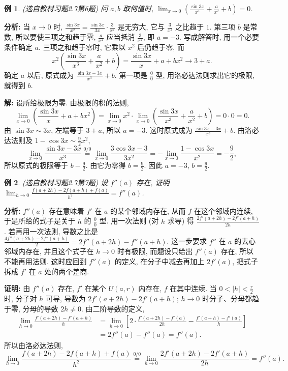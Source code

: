 \documentclass[UTF8,openany]{ctexbook}
\theoremstyle{chinesetextbook}
\newtheorem{example}{例}[section]
\newenvironment{cnproof}{\par\indent\textbf{证明:} \ignorespaces}{\par}
\newenvironment{cnsolution}{\par\indent\textbf{解:} \ignorespaces}{\par}
\begin{document}
\begin{example}\label{ex:c2-h7-6}
\textnormal{(选自教材习题2.7第6题)} 问 $a,b$ 取何值时, $\displaystyle\lim_{x\to0}\left(\frac{\sin3x}{x^3}+\frac a{x^2}+b\right)=0$.
\end{example}
\par\indent\textbf{分析:} 当 $x\to0$ 时, $\displaystyle\frac{\sin3x}{x^3}=\frac{\sin3x}{3x}\cdot\frac3{x^2}$ 是无穷大, 它与 $\displaystyle\frac3{x^2}$ 之比趋于 $1$. 第三项 $b$ 是常数, 所以要使三项之和趋于零, $\displaystyle\frac a{x^2}$ 应当抵消 $\displaystyle\frac3{x^2}$, 即 $a=-3$. 写成解答时, 用一个必要条件确定 $a$. 三项之和趋于零时, 它乘以 $x^2$ 后仍趋于零, 而
\[
x^2\left(\frac{\sin3x}{x^3}+\frac a{x^2}+b\right)=\frac{\sin3x}x+a+bx^2\to3+a.
\]
确定 $a$ 以后, 原式成为 $\displaystyle\frac{\sin3x-3x}{x^3}+b$. 第一项是 $\displaystyle\frac00$ 型, 用洛必达法则求出它的极限, 就得到 $b$.
\begin{cnsolution}
设所给极限为零. 由极限的积的法则,
\[
\lim_{x\to0}\left(\frac{\sin3x}x+a+bx^2\right)=\lim_{x\to0}x^2\cdot\lim_{x\to0}\left(\frac{\sin3x}{x^3}+\frac a{x^2}+b\right)=0\cdot0=0.
\]
由 $\sin3x\sim3x$, 左端等于 $3+a$, 所以 $a=-3$. 这时原式成为 $\displaystyle\frac{\sin3x-3x}{x^3}+b$. 由洛必达法则及 $\displaystyle1-\cos3x\sim\frac92x^2$,
\[
\lim_{x\to0}\frac{\sin3x-3x}{x^3}\overset{0/0}{=}\lim_{x\to0}\frac{3\cos3x-3}{3x^2}=-\lim_{x\to0}\frac{1-\cos3x}{x^2}=-\frac92,
\]
所以原式的极限等于 $\displaystyle b-\frac92$. 由它为零得 $\displaystyle b=\frac92$. 因此 $a=-3$, $\displaystyle b=\frac92$.
\end{cnsolution}
\begin{example}\label{ex:c2-h7-7}
\textnormal{(选自教材习题2.7第7题)} 设 $f''(a)$ 存在, 证明 $\displaystyle\lim_{h\to0}\frac{f(a+2h)-2f(a+h)+f(a)}{h^2}=f''(a)$.
\end{example}
\par\indent\textbf{分析:} $f''(a)$ 存在意味着 $f'$ 在 $a$ 的某个邻域内存在, 从而 $f$ 在这个邻域内连续, 于是所给的式子是关于 $h$ 的 $\displaystyle\frac00$ 型. 用一次法则 (对 $h$ 求导) 得 $\displaystyle\frac{2f'(a+2h)-2f'(a+h)}{2h}$. 若再用一次法则, 导数之比是 $\displaystyle\frac{4f''(a+2h)-2f''(a+h)}2=2f''(a+2h)-f''(a+h)$. 这一步要求 $f''$ 在 $a$ 的去心邻域内存在, 并且这个式子在 $h\to0$ 时有极限, 而题设只给出 $f''(a)$ 存在, 所以不能再用法则. 这时应回到 $f''(a)$ 的定义, 在分子中减去再加上 $2f'(a)$, 把式子拆成 $f'$ 在 $a$ 处的两个差商.
\begin{cnproof}
由 $f''(a)$ 存在, $f'$ 在某个 $U(a,r)$ 内存在, $f$ 在其中连续. 当 $\displaystyle0<|h|<\frac r2$ 时, 分子对 $h$ 可导, 导数为 $2f'(a+2h)-2f'(a+h)$; $h\to0$ 时分子、分母都趋于零, 分母的导数 $2h\ne0$. 由二阶导数的定义,
\[
\begin{aligned}
\lim_{h\to0}\frac{f'(a+2h)-f'(a+h)}h&=\lim_{h\to0}\left[2\cdot\frac{f'(a+2h)-f'(a)}{2h}-\frac{f'(a+h)-f'(a)}h\right]\\
&=2f''(a)-f''(a)=f''(a).
\end{aligned}
\]
所以由洛必达法则,
\[
\lim_{h\to0}\frac{f(a+2h)-2f(a+h)+f(a)}{h^2}\overset{0/0}{=}\lim_{h\to0}\frac{2f'(a+2h)-2f'(a+h)}{2h}=f''(a).
\]
\end{cnproof}
\end{document}
